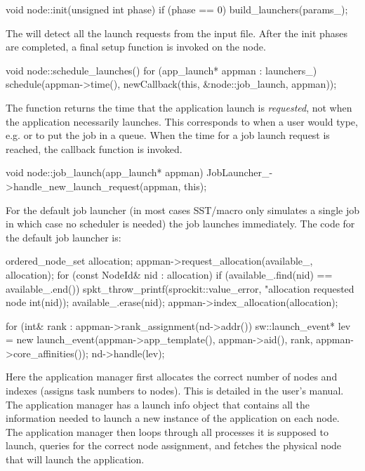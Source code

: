 \begin{CppCode}
void node::init(unsigned int phase)
{
  if (phase == 0){
    build_launchers(params_);
  }
}
\end{CppCode}
The  will detect all the launch requests from the input file.  After the init phases are completed, a final setup function is invoked on the node.

\begin{CppCode}
void node::schedule_launches()
{
  for (app_launch* appman : launchers_){
    schedule(appman->time(), newCallback(this, &node::job_launch, appman));
  }
}
\end{CppCode}
The function  returns the time that the application launch is \emph{requested}, not when the application  necessarily launches.
This corresponds to when a user would type, e.g.  or  to put the job in a queue.
When the time for a job launch request is reached, the callback function is invoked.

\begin{CppCode}
void node::job_launch(app_launch* appman)
{
  JobLauncher_->handle_new_launch_request(appman, this);
}
\end{CppCode}
For the default job launcher (in most cases SST/macro only simulates a single job in which case no scheduler is needed) the job launches immediately. 
The code for the default job launcher is:

\begin{CppCode}
ordered_node_set allocation;
appman->request_allocation(available_, allocation);
for (const NodeId& nid : allocation){
  if (available_.find(nid) == available_.end()){
    spkt_throw_printf(sprockit::value_error,
                      "allocation requested node %
                      int(nid));
  }
  available_.erase(nid);
}
appman->index_allocation(allocation);

for (int& rank : appman->rank_assignment(nd->addr()){
  sw::launch_event* lev = new launch_event(appman->app_template(), appman->aid(),
                                             rank, appman->core_affinities());
  nd->handle(lev);
}
\end{CppCode}
Here the application manager first allocates the correct number of nodes and indexes (assigns task numbers to nodes).
This is detailed in the user's manual.
The application manager has a launch info object that contains all the information needed to launch a new instance of the application on each node.
The application manager then loops through all processes it is supposed to launch,
queries for the correct node assignment,
and fetches the physical node that will launch the application.

